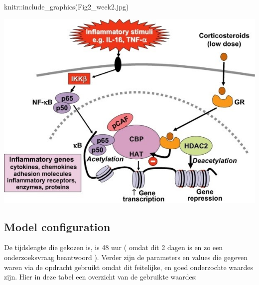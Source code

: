 \documentclass[
]{article}
\newenvironment{Shaded}{\begin{snugshade}}{\end{snugshade}}
\newcommand{\FunctionTok}[1]{\textcolor[rgb]{0.00,0.00,0.00}{#1}}
\newcommand{\NormalTok}[1]{#1}
\newcommand{\SpecialCharTok}[1]{\textcolor[rgb]{0.00,0.00,0.00}{#1}}
\newcommand{\StringTok}[1]{\textcolor[rgb]{0.31,0.60,0.02}{#1}}
\begin{document}
\begin{Shaded}
\begin{Highlighting}[]
\NormalTok{knitr}\SpecialCharTok{::}\FunctionTok{include\_graphics}\NormalTok{(}\StringTok{\textquotesingle{}Fig2\_week2.jpg\textquotesingle{}}\NormalTok{)}
\end{Highlighting}
\end{Shaded}

\includegraphics{Fig2_week2.jpg}

\hypertarget{model-configuration}{%
\subsection{Model configuration}\label{model-configuration}}

De tijdslengte die gekozen is, is 48 uur ( omdat dit 2 dagen is en zo
een onderzoeksvraag beantwoord ). Verder zijn de parameters en values
die gegeven waren via de opdracht gebruikt omdat dit feitelijke, en goed
onderzochte waardes zijn. Hier in deze tabel een overzicht van de
gebruikte waardes:
\end{document}

